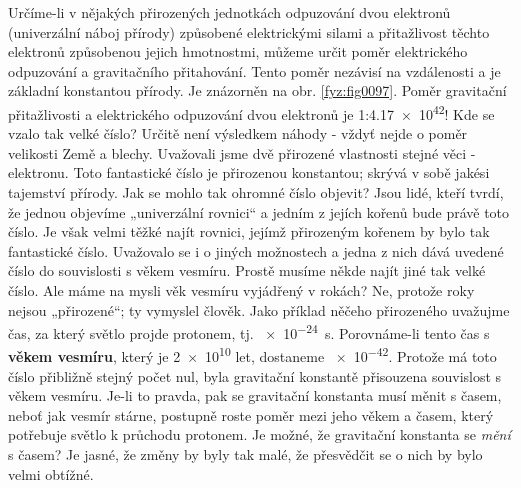     Určíme-li v nějakých přirozených jednotkách odpuzování dvou elektronů (univerzální náboj 
    přírody) způsobené elektrickými silami a přitažlivost těchto elektronů způsobenou jejich 
    hmotnostmi, můžeme určit poměr elektrického odpuzování a gravitačního přitahování. Tento poměr 
    nezávisí na vzdálenosti a je základní konstantou přírody. Je znázorněn na obr. 
    \ref{fyz:fig0097}. Poměr gravitační přitažlivosti a elektrického odpuzování dvou elektronů je 
    1:\num{4.17e42}! Kde se vzalo tak velké číslo? Určitě není výsledkem náhody - vždyť nejde o 
    poměr velikosti Země a blechy. Uvažovali jsme dvě přirozené vlastnosti stejné věci - elektronu. 
    Toto fantastické číslo je přirozenou konstantou; skrývá v sobě jakési tajemství přírody. Jak se 
    mohlo tak ohromné číslo objevit? Jsou lidé, kteří tvrdí, že jednou objevíme „univerzální 
    rovnici“ a jedním z jejích kořenů bude právě toto číslo. Je však velmi těžké najít rovnici, 
    jejímž přirozeným kořenem by bylo tak fantastické číslo. Uvažovalo se i o jiných možnostech a 
    jedna z nich dává uvedené číslo do souvislosti s věkem vesmíru. Prostě musíme někde najít jiné 
    tak velké číslo. Ale máme na mysli věk vesmíru vyjádřený v rokách? Ne, protože roky nejsou 
    „přirozené“; ty vymyslel člověk. Jako příklad něčeho přirozeného uvažujme čas, za který světlo 
    projde protonem, tj. \qty{e-24}{\s}. Porovnáme-li tento čas s \textbf{věkem vesmíru}, který je 
    \num{2e10} let, dostaneme \num{e-42}. Protože má toto číslo přibližně stejný počet nul, byla 
    gravitační konstantě přisouzena souvislost s věkem vesmíru. Je-li to pravda, pak se gravitační 
    konstanta musí měnit s časem, neboť jak vesmír stárne, postupně roste poměr mezi jeho věkem a 
    časem, který potřebuje světlo k průchodu protonem. Je možné, že gravitační konstanta se 
    \emph{mění} s časem? Je jasné, že změny by byly tak malé, že přesvědčit se o nich by bylo velmi 
    obtížné.
    
